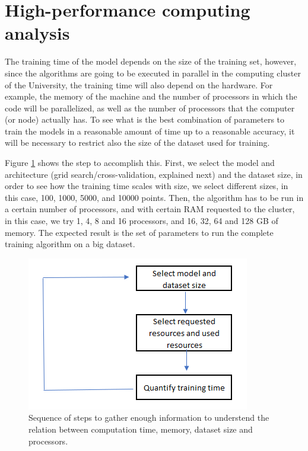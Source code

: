 \section{ High-performance computing analysis}
The training time of the model depends on the size of the training set, however, since the algorithms are going to be executed in parallel in the computing cluster of the University, the training time will also depend on the hardware. For example, the memory of the machine and the number of processors in which the code will be parallelized, as well as the number of processors that the computer (or node) actually has. To see what is the best combination of parameters to train the models in a reasonable amount of time up to a reasonable accuracy, it will be necessary to restrict also the size of the dataset used for training.

Figure \ref{fig:metho2} shows the step to accomplish this. First, we select the model and architecture (grid search/cross-validation, explained next) and the dataset size, in order to see how the training time scales with size, we  select different sizes, in this case, 100, 1000, 5000, and 10000 points. Then, the algorithm has to be run in a certain number of processors, and with certain RAM requested to the cluster, in this case, we try 1, 4, 8 and 16 processors, and 16, 32, 64 and 128 GB of memory. The expected result is the set of parameters to run the complete training algorithm on a big dataset. 
\begin{figure}[h!]
	\centering
	\includegraphics[width=0.7\linewidth]{TeX_files/Imagenes/metho_2}
	\caption{Sequence of steps to gather enough information to understend the relation between computation time, memory, dataset size and processors.}
	\label{fig:metho2}
\end{figure}

